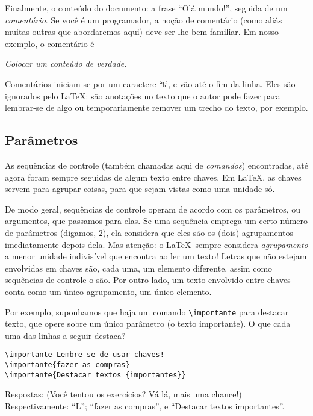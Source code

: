 Finalmente, o conteúdo do documento: a frase ``Olá mundo!'', seguida
de um \emph{comentário}. Se você é um programador, a noção de
comentário (como aliás muitas outras que abordaremos aqui)  deve
ser-lhe bem familiar. Em nosso exemplo, o comentário é 

\begin{center}
  \textit{Colocar um conteúdo de verdade.}
\end{center}

Comentários iniciam-se por um caractere `\verb.%.', e vão até o fim da
linha. Eles são ignorados pelo \LaTeX: são anotações no texto que o autor pode fazer para lembrar-se de algo ou temporariamente remover um trecho do texto, por exemplo.

\subsection{Parâmetros}

As sequências de controle (também chamadas aqui de
\emph{comandos}) encontradas,  até agora foram
sempre seguidas de algum texto entre chaves. Em \LaTeX, as chaves
servem para agrupar coisas, para que sejam vistas como uma unidade
só. 

De modo geral, sequências de controle operam de acordo com os
parâmetros, ou argumentos, que passamos para elas. Se uma sequência
emprega um certo número de parâmetros (digamos, 2), ela considera que
eles são os (dois) agrupamentos imediatamente depois dela. Mas
atenção: o \LaTeX\ sempre considera \emph{agrupamento} a menor unidade indivisível
que encontra ao ler um texto! Letras que não estejam  envolvidas em
chaves são, cada uma, um elemento diferente, assim como sequências de
controle o são. Por outro lado, um texto envolvido entre chaves conta
como um único agrupamento, um único elemento.

Por exemplo, suponhamos que haja um comando \verb!\importante! para
destacar texto, que opere sobre um único parâmetro (o texto
importante). O que cada uma das linhas a seguir destaca?

\begin{footnotesize}
\begin{verbatim}
\importante Lembre-se de usar chaves!
\importante{fazer as compras}
\importante{Destacar textos {importantes}}
\end{verbatim}
\end{footnotesize}

Respostas: (Você tentou os exercícios? Vá lá, mais uma chance!)
Respectivamente: ``L''; ``fazer as compras'', e ``Destacar textos {importantes}''.

